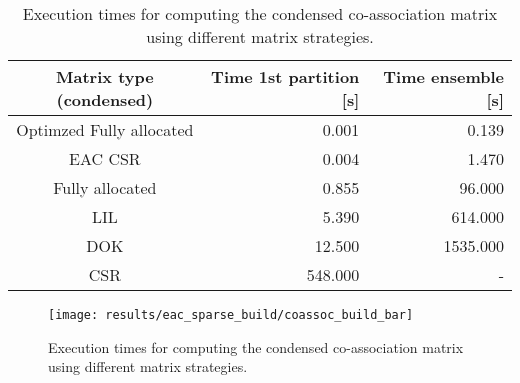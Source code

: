 \begin{table}[h]
\centering
 \caption{Execution times for computing the condensed co-association matrix using different matrix strategies.}
\begin{tabular}{crr}
\toprule
  Matrix type (condensed) &  Time 1st partition [s] &  Time ensemble [s] \\
\midrule
 Optimzed Fully allocated &                 0.001 &              0.139 \\
                  EAC CSR &                 0.004 &              1.470 \\
          Fully allocated &                 0.855 &             96.000 \\
                      LIL &                 5.390 &            614.000 \\
                      DOK &                12.500 &           1535.000 \\
                      CSR &               548.000 &                - \\
\bottomrule
\end{tabular}
\label{tab:coassoc build sparse}
\end{table}



\begin{figure}[hbtp]
\centering
\texttt{[image: results/eac\_sparse\_build/coassoc\_build\_bar]}
\caption{Execution times for computing the condensed co-association matrix using different matrix strategies.}
\label{fig:coassoc build sparse}
\end{figure}